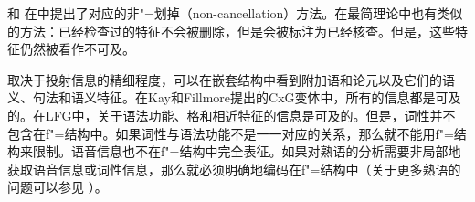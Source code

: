  \citet[]{Higginbotham85a}和 \citet{Winkler97a}在\gbtc 中提出了对应的非"=划掉（non-cancellation）方法。在最简理论中也有类似的方法：已经检查过的特征不会被删除，但是会被标注为已经核查\citep[]{Stabler2010b}。但是，这些特征仍然被看作不可及。\label{page-non-cancellation-end}

取决于投射信息的精细程度，可以在嵌套结构中看到附加语和论元以及它们的语义、句法和语义特征。在Kay和Fillmore提出的CxG变体中，所有的信息都是可及的。在LFG中，关于语法功能、格和相近特征的信息是可及的。但是，词性并不包含在f"=结构中。如果词性与语法功能不是一一对应的关系，那么就不能用f"=结构来限制。语音信息也不在f"=结构中完全表征。如果对熟语的分析需要非局部地获取语音信息或词性信息，那么就必须明确地编码在f"=结构中（关于更多熟语的问题可以参见 ）。

